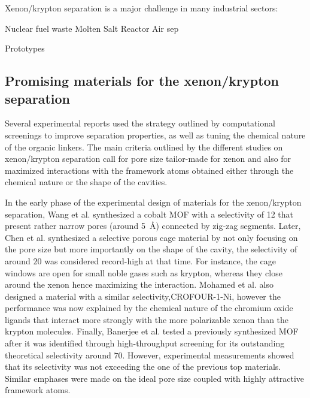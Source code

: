 \documentclass[main.tex]{subfiles}
\begin{document}
Xenon/krypton separation is a major challenge in many industrial sectors:

Nuclear fuel waste
Molten Salt Reactor
Air sep

Prototypes\cite{Banerjee_2014}


\subsection{Promising materials for the xenon/krypton separation}

Several experimental reports used the strategy outlined by computational screenings to improve separation properties, as well as tuning the chemical nature of the organic linkers. The main criteria outlined by the different studies on xenon/krypton separation call for pore size tailor-made for xenon and also for maximized interactions with the framework atoms obtained either through the chemical nature or the shape of the cavities. 

In the early phase of the experimental design of materials for the xenon/krypton separation, Wang et al. synthesized a cobalt MOF  with a selectivity of 12 that present rather narrow pores (around \SI{5}{\angstrom}) connected by zig-zag segments.\cite{Wang_2014} Later, Chen et al. synthesized a selective porous cage material by not only focusing on the pore size but more importantly on the shape of the cavity, the selectivity of around $20$ was considered record-high at that time. For instance, the cage windows are open for small noble gases such as krypton, whereas they close around the xenon hence maximizing the interaction.\cite{Chen_2014} Mohamed et al. also designed a material with a similar selectivity,CROFOUR-1-Ni, however the performance was now explained by the chemical nature of the chromium oxide ligands that interact more strongly with the more polarizable xenon than the krypton molecules.\cite{Mohamed_2016} Finally, Banerjee et al. tested a previously synthesized\cite{KAXQIL} MOF after it was identified through high-throughput screening\cite{Simon_2015} for its outstanding theoretical selectivity around $70$. However, experimental measurements showed that its selectivity was not exceeding the one of the previous top materials. Similar emphases were made on the ideal pore size coupled with highly attractive framework atoms.\cite{Banerjee_2016}
\end{document}
